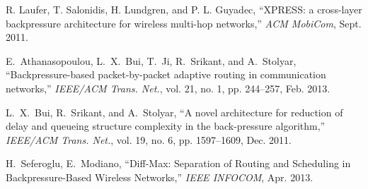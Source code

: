\documentclass[conference]{IEEEtran}
\begin{document}
\begin{thebibliography}{}
 R. Laufer, T. Salonidis, H. Lundgren, and P. L. Guyadec, ``XPRESS: a cross-layer backpressure architecture for wireless multi-hop networks,'' {\em ACM MobiCom}, Sept. 2011.
    
 E.~Athanasopoulou, L.~X.~Bui, T.~Ji, R.~Srikant, and A.~Stolyar, ``Backpressure-based packet-by-packet adaptive routing in communication networks,'' {\em IEEE/ACM Trans. Net.}, vol. 21, no. 1, pp. 244--257, Feb. 2013.

 L.~X.~Bui, R.~Srikant, and A.~Stolyar, ``A novel architecture for reduction of delay and queueing structure complexity in the back-pressure algorithm,'' {\em IEEE/ACM Trans. Net.}, vol. 19, no. 6, pp. 1597--1609, Dec. 2011.

 H.~Seferoglu, E.~Modiano, ``Diff-Max: Separation of Routing and Scheduling in Backpressure-Based Wireless Networks,'' {\em IEEE INFOCOM}, Apr. 2013.

\end{thebibliography}
\end{document}
